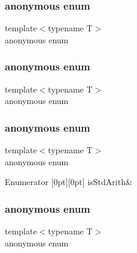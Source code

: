 \mbox{\label{classUtil_1_1TypeTraits_a3d9fa2a052e3e731586d1a714de17d6c}} 
\subsubsection{\texorpdfstring{anonymous enum}{anonymous enum}}
{\footnotesize\ttfamily template$<$typename T$>$ \\
anonymous enum}

\mbox{\label{classUtil_1_1TypeTraits_ac84adcf827783dd2ae3abca0f67641f4}} 
\subsubsection{\texorpdfstring{anonymous enum}{anonymous enum}}
{\footnotesize\ttfamily template$<$typename T$>$ \\
anonymous enum}

\mbox{\label{classUtil_1_1TypeTraits_abfcd1f4b7a5011b6ea8b965d1b46e54e}} 
\subsubsection{\texorpdfstring{anonymous enum}{anonymous enum}}
{\footnotesize\ttfamily template$<$typename T$>$ \\
anonymous enum}

\begin{DoxyEnumFields}{Enumerator}
[0pt][0pt]{}\mbox{\label{classUtil_1_1TypeTraits_abfcd1f4b7a5011b6ea8b965d1b46e54ea3017f19abc6084d7e144891aaf5adb0f}} 
is\+Std\+Arith&\\
\hline

\end{DoxyEnumFields}
\mbox{\label{classUtil_1_1TypeTraits_ae92d99a34daca0ca219bbab6663bb6be}} 
\subsubsection{\texorpdfstring{anonymous enum}{anonymous enum}}
{\footnotesize\ttfamily template$<$typename T$>$ \\
anonymous enum}

